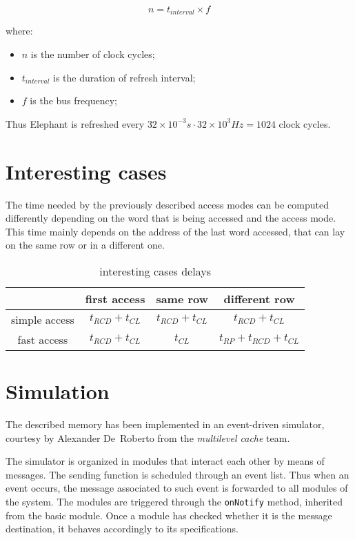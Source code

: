 \documentclass[a4paper,12pt]{article}
\newcommand{\memoryname}{Elephant}
\begin{document}
$$ n = t_{interval} \times f $$

where:

\begin{itemize}
  \item $ n $ is the number of clock cycles;
  \item $ t_{interval} $ is the duration of refresh interval;
  \item $ f $ is the bus frequency;
\end{itemize}

Thus \memoryname{} is refreshed every $ 32 \times 10^{-3} s \cdot 32 \times 10^{3} Hz = 1024 $ clock cycles.

\section{Interesting cases}
The time needed by the previously described access modes can be computed differently depending on the word that is being accessed and the access mode.
This time mainly depends on the address of the last word accessed, that can lay on the same row or in a different one.

\begin{table}[H]
\centering
\bgroup
\def\arraystretch{1.5}  %
\begin{tabular}{| c | c | c | c |}\hline
                & first access & same row & different row \\ \hline
  simple access & $t_{RCD} + t_{CL} $ & $t_{RCD} + t_{CL}$ & $t_{RCD} + t_{CL}$\\ \hline
  fast access & $t_{RCD} + t_{CL}$ & $t_{CL}$ & $t_{RP} + t_{RCD} + t_{CL}$ \\ \hline
\end{tabular}
\egroup
\caption{interesting cases delays}
\end{table}

\section{Simulation}
The described memory has been implemented in an event-driven simulator, courtesy by Alexander De~Roberto from the \emph{multilevel cache} team.

The simulator is organized in modules that interact each other by means of messages. The sending function is scheduled through an event list. Thus when an event occurs, the message associated to such event is forwarded to all modules of the system. The modules are triggered through the \texttt{onNotify} method, inherited from the basic module. Once a module has checked whether it is the message destination, it behaves accordingly to its specifications.
\end{document}
